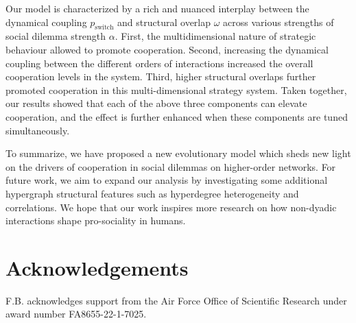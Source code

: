 \documentclass[a4paper,pre,reqno,superscriptaddress,twocolumn, floatfix]{revtex4}
\begin{document}
Our model is characterized by a rich and nuanced interplay between the dynamical coupling $p_{\text{switch}}$ and structural overlap $\omega$ across various strengths of social dilemma strength $\alpha$. First, the multidimensional nature of strategic behaviour allowed to promote cooperation. Second, increasing the dynamical coupling between the different orders of interactions increased the overall cooperation levels in the system. Third, higher structural overlaps further promoted cooperation in this multi-dimensional strategy system. Taken together, our results showed that each of the above three components can elevate cooperation, and the effect is further enhanced when these components are tuned simultaneously.



To summarize, we have proposed a new evolutionary model which sheds new light on the drivers of cooperation in social dilemmas on higher-order networks. For future work, we aim to expand our analysis by investigating some additional hypergraph structural features such as hyperdegree heterogeneity and correlations. We hope that our work inspires more research on how non-dyadic interactions shape pro-sociality in humans.




 



\section*{Acknowledgements}
F.B. acknowledges support from the Air Force Office of Scientific Research under award number FA8655-22-1-7025.
\end{document}
